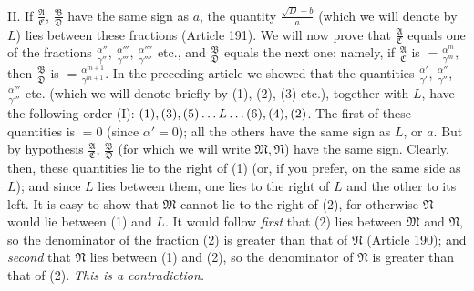 II. If $\frac{\mathfrak{A}}{\mathfrak{C}}$, $\frac{\mathfrak{B}}{\mathfrak{D}}$ have the same sign as $a$, the quantity $\frac{\surd D-b}{a}$ (which we will denote by $L$) lies between these fractions (Article 191). We will now prove that $\frac{\mathfrak{A}}{\mathfrak{C}}$ equals one of the fractions $\frac{\alpha''}{\gamma''}$, $\frac{\alpha'''}{\gamma'''}$, $\frac{\alpha''''}{\gamma''''}$ etc., and $\frac{\mathfrak{B}}{\mathfrak{D}}$ equals the next one: namely, if $\frac{\mathfrak{A}}{\mathfrak{C}}$ is $=\frac{\alpha^m}{\gamma^m}$, then $\frac{\mathfrak{B}}{\mathfrak{D}}$ is $=\frac{\alpha^{m+1}}{\gamma^{m+1}}$. In the preceding article we showed that the quantities $\frac{\alpha'}{\gamma'}$, $\frac{\alpha''}{\gamma''}$, $\frac{\alpha'''}{\gamma'''}$ etc. (which we will denote briefly by (1), (2), (3) etc.), together with $L$, have the following order (I): $(1),(3),(5)\mathinner{\ldotp\ldotp\ldotp} L\mathinner{\ldotp\ldotp\ldotp}(6),(4),(2)$. The first of these quantities is $=0$ (since $\alpha'=0$); all the others have the same sign as $L$, or $a$. But by hypothesis $\frac{\mathfrak{A}}{\mathfrak{C}}$, $\frac{\mathfrak{B}}{\mathfrak{D}}$ (for which we will write $\mathfrak{M},\mathfrak{N}$) have the same sign. Clearly, then, these quantities lie to the right of (1) (or, if you prefer, on the same side as $L$); and since $L$ lies between them, one lies to the right of $L$ and the other to its left. It is easy to show that $\mathfrak{M}$ cannot lie to the right of (2), for otherwise $\mathfrak{N}$ would lie between (1) and $L$. It would follow \textit{first} that (2) lies between $\mathfrak{M}$ and $\mathfrak{N}$, so the denominator of the fraction (2) is greater than that of $\mathfrak{N}$ (Article 190); and \textit{second} that $\mathfrak{N}$ lies between (1) and (2), so the denominator of $\mathfrak{N}$ is greater than that of (2). \textit{This is a contradiction.}

